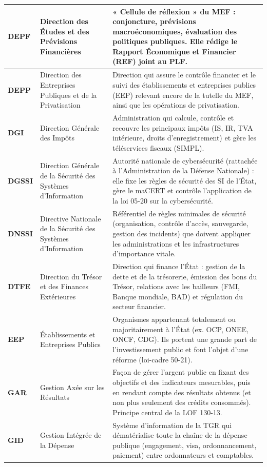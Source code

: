 {\begin{longtable}{|p{1.8cm}|p{4.9cm}|p{8.8cm}|}
\textbf{DEPF} & Direction des Études et des Prévisions Financières & « Cellule de réflexion » du MEF : conjoncture, prévisions macroéconomiques, évaluation des politiques publiques. Elle rédige le Rapport Économique et Financier (REF) joint au PLF. \\ \hline
\textbf{DEPP} & Direction des Entreprises Publiques et de la Privatisation & Direction qui assure le contrôle financier et le suivi des établissements et entreprises publics (EEP) relevant encore de la tutelle du MEF, ainsi que les opérations de privatisation. \\ \hline
\textbf{DGI} & Direction Générale des Impôts & Administration qui calcule, contrôle et recouvre les principaux impôts (IS, IR, TVA intérieure, droits d'enregistrement) et gère les téléservices fiscaux (SIMPL). \\ \hline
\textbf{DGSSI} & Direction Générale de la Sécurité des Systèmes d'Information & Autorité nationale de cybersécurité (rattachée à l'Administration de la Défense Nationale) : elle fixe les règles de sécurité des SI de l'État, gère le maCERT et contrôle l'application de la loi 05-20 sur la cybersécurité. \\ \hline
\textbf{DNSSI} & Directive Nationale de la Sécurité des Systèmes d'Information & Référentiel de règles minimales de sécurité (organisation, contrôle d'accès, sauvegarde, gestion des incidents) que doivent appliquer les administrations et les infrastructures d'importance vitale. \\ \hline
\textbf{DTFE} & Direction du Trésor et des Finances Extérieures & Direction qui finance l'État : gestion de la dette et de la trésorerie, émission des bons du Trésor, relations avec les bailleurs (FMI, Banque mondiale, BAD) et régulation du secteur financier. \\ \hline
\textbf{EEP} & Établissements et Entreprises Publics & Organismes appartenant totalement ou majoritairement à l'État (ex. OCP, ONEE, ONCF, CDG). Ils portent une grande part de l'investissement public et font l'objet d'une réforme (loi-cadre 50-21). \\ \hline
\textbf{GAR} & Gestion Axée sur les Résultats & Façon de gérer l'argent public en fixant des objectifs et des indicateurs mesurables, puis en rendant compte des résultats obtenus (et non plus seulement des crédits consommés). Principe central de la LOF 130-13. \\ \hline
\textbf{GID} & Gestion Intégrée de la Dépense & Système d'information de la TGR qui dématérialise toute la chaîne de la dépense publique (engagement, visa, ordonnancement, paiement) entre ordonnateurs et comptables. \\ \hline

\end{longtable}}
